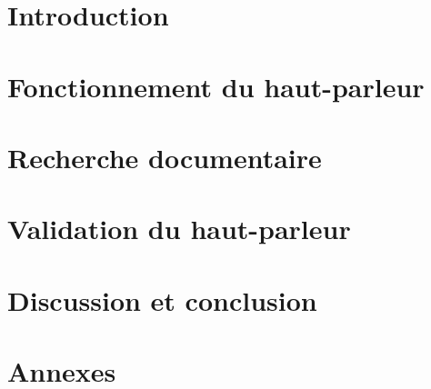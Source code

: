 \documentclass{report}
\begin{document}





\clearpage
\tableofcontents
\clearpage

\chapter{Introduction}



\chapter{Fonctionnement du haut-parleur}











\chapter{Recherche documentaire}





\chapter{Validation du haut-parleur}



\chapter{Discussion et conclusion}




\clearpage



\nocite{*}

\chapter{Annexes}


\clearpage


\clearpage


\clearpage


\clearpage


\end{document}
